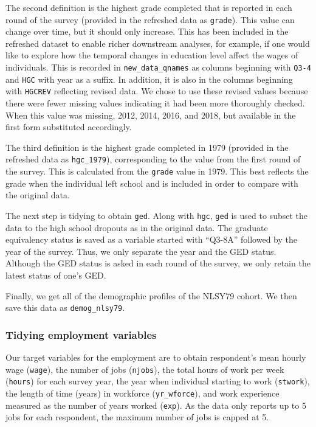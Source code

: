 \documentclass[12pt]{article}
\begin{document}
The second definition is the highest grade completed that is reported in each round of the survey (provided in the refreshed data as \texttt{grade}). This value can change over time, but it should only increase. This has been included in the refreshed dataset to enable richer downstream analyses, for example, if one would like to explore how the temporal changes in education level affect the wages of individuals. This is recorded in \texttt{new\_data\_qnames} as columns beginning with \texttt{Q3-4} and \texttt{HGC} with year as a suffix. In addition, it is also in the columns beginning with \texttt{HGCREV} reflecting revised data. We chose to use these revised values because there were fewer missing values indicating it had been more thoroughly checked. When this value was missing, 2012, 2014, 2016, and 2018, but available in the first form substituted accordingly.

The third definition is the highest grade completed in 1979 (provided in the refreshed data as \texttt{hgc\_1979}), corresponding to the value from the first round of the survey. This is calculated from the \texttt{grade} value in 1979. This best reflects the grade when the individual left school and is included in order to compare with the original data.

The next step is tidying to obtain \texttt{ged}. Along with \texttt{hgc}, \texttt{ged} is used to subset the data to the high school dropouts as in the original data. The graduate equivalency status is saved as a variable started with ``Q3-8A'' followed by the year of the survey. Thus, we only separate the year and the GED status. Although the GED status is asked in each round of the survey, we only retain the latest status of one's GED.

Finally, we get all of the demographic profiles of the NLSY79 cohort. We then save this data as \texttt{demog\_nlsy79}.

\hypertarget{tidyemp}{%
\subsubsection{Tidying employment variables}\label{tidyemp}}

Our target variables for the employment are to obtain respondent's mean hourly wage (\texttt{wage}), the number of jobs (\texttt{njobs}), the total hours of work per week (\texttt{hours}) for each survey year, the year when individual starting to work (\texttt{stwork}), the length of time (years) in workforce (\texttt{yr\_wforce}), and work experience measured as the number of years worked (\texttt{exp}). As the data only reports up to 5 jobs for each respondent, the maximum number of jobs is capped at 5.
\end{document}
